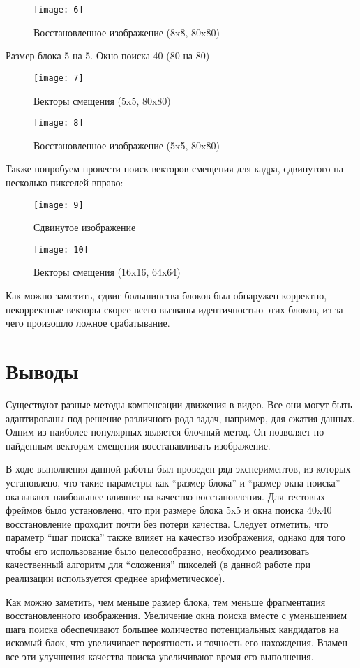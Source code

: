 \begin{figure}[H]
	\centering
	\texttt{[image: 6]}
	\caption{Восстановленное изображение (8x8, 80x80)}
	\label{pic:6}
\end{figure}

Размер блока 5 на 5. Окно поиска 40 (80 на 80)

\begin{figure}[H]
	\centering
	\texttt{[image: 7]}
	\caption{Векторы смещения (5x5, 80x80)}
	\label{pic:7}
\end{figure}

\begin{figure}[H]
	\centering
	\texttt{[image: 8]}
	\caption{Восстановленное изображение (5x5, 80x80)}
	\label{pic:8}
\end{figure}

Также попробуем провести поиск векторов смещения для кадра, сдвинутого на несколько пикселей вправо:

\begin{figure}[H]
	\centering
	\texttt{[image: 9]}
	\caption{Сдвинутое изображение}
	\label{pic:9}
\end{figure}

\begin{figure}[H]
	\centering
	\texttt{[image: 10]}
	\caption{Векторы смещения (16x16, 64x64)}
	\label{pic:10}
\end{figure}

Как можно заметить, сдвиг большинства блоков был обнаружен корректно, некорректные векторы скорее всего вызваны идентичностью этих блоков, из-за чего произошло ложное срабатывание.

\section{Выводы}

Существуют разные методы компенсации движения в видео. Все они могут быть адаптированы под решение различного рода задач, например, для сжатия данных. Одним из наиболее популярных является блочный метод. Он позволяет по найденным векторам смещения восстанавливать изображение.

В ходе выполнения данной работы был проведен ряд экспериментов, из которых установлено, что такие параметры как "`размер блока"' и "`размер окна поиска"' оказывают наибольшее влияние на качество восстановления. Для тестовых фреймов было установлено, что при размере блока 5x5 и окна поиска 40x40 восстановление проходит почти без потери качества. Следует отметить, что параметр "`шаг поиска"' также влияет на качество изображения, однако для того чтобы его использование было целесообразно, необходимо реализовать качественный алгоритм для "`сложения"' пикселей (в данной работе при реализации используется среднее арифметическое). 

Как можно заметить, чем меньше размер блока, тем меньше фрагментация восстановленного изображения. Увеличение окна поиска вместе с уменьшением шага поиска обеспечивают большее количество потенциальных кандидатов на искомый блок, что увеличивает вероятность и точность его нахождения. Взамен все эти улучшения качества поиска увеличивают время его выполнения. 
